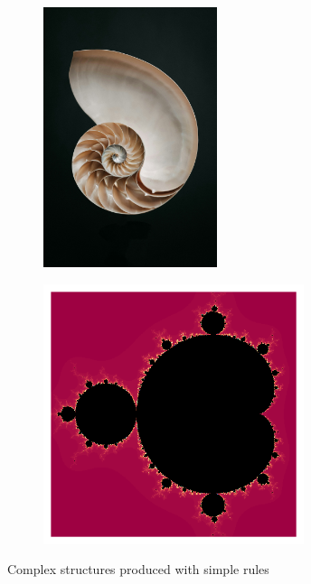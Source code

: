 \documentclass[
  letterpaper,
  DIV=11,
  numbers=noendperiod]{scrreprt}
\begin{document}
\begin{figure}

\begin{minipage}{0.50\linewidth}

\begin{figure}[H]

{\centering \includegraphics[width=\textwidth,height=3in]{nautilus-OUP.jpg}

}


\end{figure}%

\end{minipage}%
%
\begin{minipage}{0.50\linewidth}

\begin{figure}[H]

{\centering \includegraphics[width=\textwidth,height=3in]{mandelbrot.png}

}


\end{figure}%

\end{minipage}%
\newline
\begin{minipage}{0.50\linewidth}
Complex structures produced with simple rules\end{minipage}%

\end{figure}%
\end{document}
